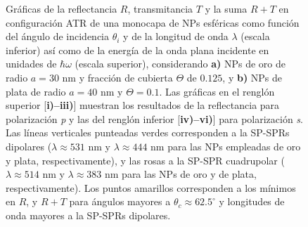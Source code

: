 \begin{figure}[t!]
\begin{subfigure}{.7\linewidth}
		\end{subfigure}\vspace*{-.5em}
	\caption{Gráficas de la reflectancia $R$, transmitancia $T$ y la suma $R+T$   en configuración ATR de una monocapa de NPs esféricas como función del ángulo de incidencia $\theta_i$ y de la longitud de onda $\lambda$ (escala inferior) así como de la energía de la onda plana incidente en unidades de $\hbar\omega$ (escala superior), considerando \textbf{a)} NPs de oro de radio $a=30$ nm y fracción de cubierta $\Theta$ de $0.125$, y \textbf{b)} NPs de plata de radio $a=40$ nm y $\Theta=0.1$.  Las gráficas   en el renglón superior [\textbf{i)--iii)}]  muestran los resultados de la reflectancia para  polarización \emph{p} y las del renglón inferior  [\textbf{iv)--vi)}] para polarización  \emph{s}. Las líneas verticales punteadas verdes corresponden a la SP-SPRs dipolares ($\lambda\approx 531$ nm y $\lambda\approx 444$ nm para las NPs empleadas de oro y plata, respectivamente), y las rosas a la SP-SPR cuadrupolar ($\lambda\approx 514$ nm y $\lambda\approx 383$ nm para las NPs de oro y de plata, respectivamente). Los puntos amarillos corresponden a los mínimos en $R$, y $R+T$ para ángulos mayores a $\theta_c\approx 62.5^\circ$ y longitudes de onda mayores a la SP-SPRs dipolares. }\label{fig:RT-AuAg}
	\end{figure}	

